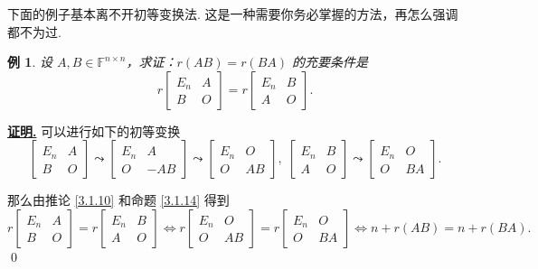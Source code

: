 \documentclass[10pt,openany]{article}
\theoremstyle{thmstyle} %
\theoremstyle{defstyle} %
\theoremstyle{prostyle} %
\theoremstyle{exastyle}
\newtheorem{example}[theorem]{例}
\theoremstyle{remstyle}
\renewenvironment{proof}[1][证明]{\par\underline{\textbf{#1.}} \;\fangsong}{\qed\par}
\newcommand{\F}{\mathbb{F}}
\newcommand{\n}{^{n \times n}}
\begin{document}
下面的例子基本离不开初等变换法. 这是一种需要你务必掌握的方法，再怎么强调都不为过.


\begin{example}
	设 \( A, B \in \F\n \)，求证：\( r(AB) = r(BA) \) 的充要条件是  
	\[ r\begin{bmatrix} E_n & A \\ B & O \end{bmatrix} = r\begin{bmatrix} E_n & B \\ A & O \end{bmatrix}. \]
\end{example}

\begin{proof}
	可以进行如下的初等变换
	\[ \begin{bmatrix} E_n & A \\ B & O \end{bmatrix} \leadsto \begin{bmatrix} E_n & A \\ O & -AB \end{bmatrix} \leadsto  \begin{bmatrix} E_n & O \\ O & AB \end{bmatrix}, \;  \begin{bmatrix} E_n & B \\ A & O \end{bmatrix} \leadsto \begin{bmatrix} E_n & O \\ O & BA \end{bmatrix}. \]
	
	那么由推论 \ref{3.1.10} 和命题 \ref{3.1.14} 得到
	\[ r\begin{bmatrix} E_n & A \\ B & O \end{bmatrix} = r\begin{bmatrix} E_n & B \\ A & O \end{bmatrix} \Leftrightarrow r\begin{bmatrix} E_n & O \\ O & AB \end{bmatrix} = r\begin{bmatrix} E_n & O \\ O & BA \end{bmatrix} \Leftrightarrow n+r(AB)=n+r(BA). \]
\end{proof}
\end{document}
